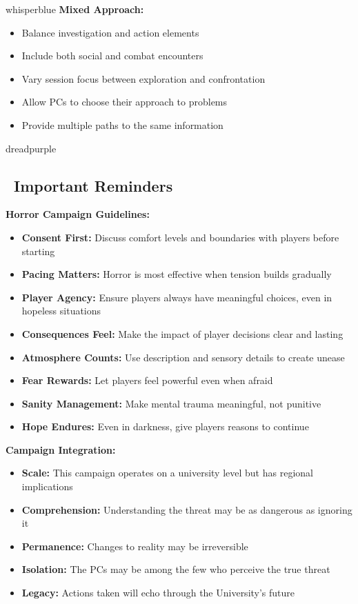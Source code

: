 \documentclass[11pt]{article}
\begin{document}
\begin{campaignsection}{whisperblue}
\textbf{Mixed Approach:}
\begin{itemize}
    \item Balance investigation and action elements
    \item Include both social and combat encounters
    \item Vary session focus between exploration and confrontation
    \item Allow PCs to choose their approach to problems
    \item Provide multiple paths to the same information
\end{itemize}
\end{campaignsection}

\begin{campaignsection}{dreadpurple}
\subsection*{\faExclamationTriangle\ Important Reminders}

\textbf{Horror Campaign Guidelines:}
\begin{itemize}
    \item \textbf{Consent First:} Discuss comfort levels and boundaries with players before starting
    \item \textbf{Pacing Matters:} Horror is most effective when tension builds gradually
    \item \textbf{Player Agency:} Ensure players always have meaningful choices, even in hopeless situations
    \item \textbf{Consequences Feel:} Make the impact of player decisions clear and lasting
    \item \textbf{Atmosphere Counts:} Use description and sensory details to create unease
    \item \textbf{Fear Rewards:} Let players feel powerful even when afraid
    \item \textbf{Sanity Management:} Make mental trauma meaningful, not punitive
    \item \textbf{Hope Endures:} Even in darkness, give players reasons to continue
\end{itemize}

\textbf{Campaign Integration:}
\begin{itemize}
    \item \textbf{Scale:} This campaign operates on a university level but has regional implications
    \item \textbf{Comprehension:} Understanding the threat may be as dangerous as ignoring it
    \item \textbf{Permanence:} Changes to reality may be irreversible
    \item \textbf{Isolation:} The PCs may be among the few who perceive the true threat
    \item \textbf{Legacy:} Actions taken will echo through the University's future
\end{itemize}


\end{campaignsection}
\end{document}
